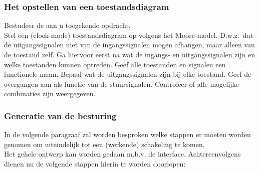 \subsubsection{Het opstellen van een toestandsdiagram}
Bestudeer de aan u toegekende opdracht.\\
Stel een (clock-mode) toestandsdiagram op volgens het Moore-model.
D.w.z.\ dat de uitgangssignalen niet van de ingangssignalen mogen afhangen,
maar alleen van de toestand zelf.
Ga hiervoor eerst na wat de ingangs- en uitgangssignalen zijn en welke toestanden kunnen optreden.
Geef alle toestanden en signalen een functionele naam.
Bepaal wat de uitgangssignalen zijn bij elke toestand.
Geef de overgangen aan als functie van de stuursignalen.
Controleer of alle mogelijke combinaties zijn weergegeven.

\subsubsection{Generatie van de besturing}
In de volgende paragraaf zal  worden besproken welke stappen er moeten
worden genomen om uiteindelijk tot een (werkende) schakeling te komen.\\
Het gehele ontwerp kan worden gedaan m.b.v. de  interface.
Achtereenvolgens dienen nu de volgende stappen hierin te worden doorlopen:
